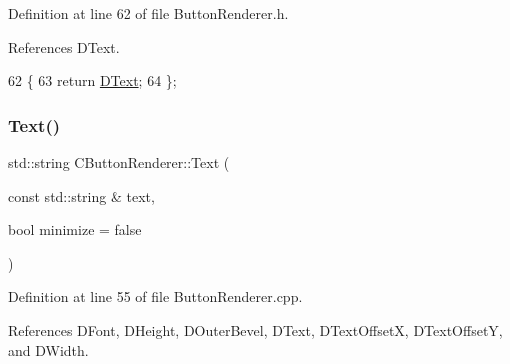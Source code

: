 Definition at line 62 of file Button\+Renderer.\+h.



References D\+Text.


\begin{DoxyCode}
62                               \{
63             \textcolor{keywordflow}{return} \hyperlink{classCButtonRenderer_a8f058166dec8d1c73adc009e4c436092}{DText};   
64         \};
\end{DoxyCode}
\hypertarget{classCButtonRenderer_a565c9c19612bc2c7fb29a22f18b74d13}{}\label{classCButtonRenderer_a565c9c19612bc2c7fb29a22f18b74d13} 
\subsubsection{\texorpdfstring{Text()}{Text()}\hspace{0.1cm}{\footnotesize\ttfamily [2/2]}}
{\footnotesize\ttfamily std\+::string C\+Button\+Renderer\+::\+Text (\begin{DoxyParamCaption}\item[{const std\+::string \&}]{text,  }\item[{bool}]{minimize = {\ttfamily false} }\end{DoxyParamCaption})}



Definition at line 55 of file Button\+Renderer.\+cpp.



References D\+Font, D\+Height, D\+Outer\+Bevel, D\+Text, D\+Text\+OffsetX, D\+Text\+OffsetY, and D\+Width.


